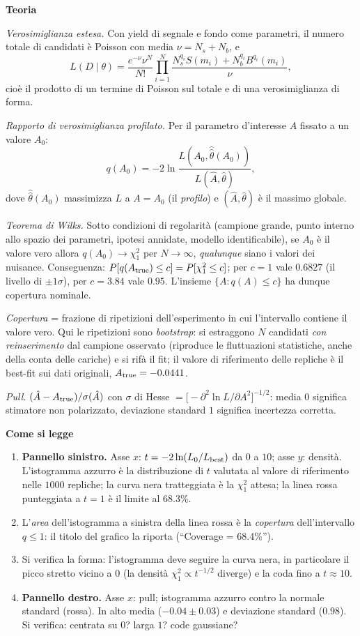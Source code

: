 \documentclass[10.5pt,a4paper]{article}
\newcommand{\sez}[1]{\par\Needspace{6\baselineskip}\medskip\noindent\textbf{\large #1}\par\nopagebreak\smallskip}
\begin{document}
\sez{Teoria}
\emph{Verosimiglianza estesa.} Con yield di segnale e fondo come parametri, il numero totale di candidati è Poisson con media $\nu=N_s+N_b$, e
\[
L(D\mid\theta)=\frac{e^{-\nu}\nu^N}{N!}\prod_{i=1}^N\frac{N_s^{q_i}S(m_i)+N_b^{q_i}B^{q_i}(m_i)}{\nu},
\]
cioè il prodotto di un termine di Poisson sul totale e di una verosimiglianza di forma.

\emph{Rapporto di verosimiglianza profilato.} Per il parametro d'interesse $A$ fissato a un valore $A_0$:
\[
q(A_0)=-2\ln\frac{L(A_0,\hat{\hat\theta}(A_0))}{L(\hat A,\hat\theta)},
\]
dove $\hat{\hat\theta}(A_0)$ massimizza $L$ a $A=A_0$ (il \emph{profilo}) e $(\hat A,\hat\theta)$ è il massimo globale.

\emph{Teorema di Wilks.} Sotto condizioni di regolarità (campione grande, punto interno allo spazio dei parametri, ipotesi annidate, modello identificabile), se $A_0$ è il valore vero allora $q(A_0)\to\chi^2_1$ per $N\to\infty$, \emph{qualunque} siano i valori dei nuisance. Conseguenza: $P[q(A_{\rm true})\le c]=P[\chi^2_1\le c]$; per $c=1$ vale $0.6827$ (il livello di $\pm1\sigma$), per $c=3.84$ vale $0.95$. L'insieme $\{A:q(A)\le c\}$ ha dunque copertura nominale.

\emph{Copertura} = frazione di ripetizioni dell'esperimento in cui l'intervallo contiene il valore vero. Qui le ripetizioni sono \emph{bootstrap}: si estraggono $N$ candidati \emph{con reinserimento} dal campione osservato (riproduce le fluttuazioni statistiche, anche della conta delle cariche) e si rifà il fit; il valore di riferimento delle repliche è il best-fit sui dati originali, $A_{\rm true}=-0.0441$.

\emph{Pull.} $(\hat A-A_{\rm true})/\sigma(\hat A)$ con $\sigma$ di Hesse $=\big[-\partial^2\ln L/\partial A^2\big]^{-1/2}$: media $0$ significa stimatore non polarizzato, deviazione standard $1$ significa incertezza corretta.

\sez{Come si legge}
\begin{enumerate}
\item \textbf{Pannello sinistro.} Asse $x$: $t=-2\ln(L_0/L_{\rm best})$ da $0$ a $10$; asse $y$: densità. L'istogramma azzurro è la distribuzione di $t$ valutata al valore di riferimento nelle $1000$ repliche; la curva nera tratteggiata è la $\chi^2_1$ attesa; la linea rossa punteggiata a $t=1$ è il limite al $68.3\%$.
\item L'\emph{area} dell'istogramma a sinistra della linea rossa è la \emph{copertura} dell'intervallo $q\le1$: il titolo del grafico la riporta (``Coverage = 68.4\%'').
\item Si verifica la forma: l'istogramma deve seguire la curva nera, in particolare il picco stretto vicino a $0$ (la densità $\chi^2_1\propto t^{-1/2}$ diverge) e la coda fino a $t\approx10$.
\item \textbf{Pannello destro.} Asse $x$: pull; istogramma azzurro contro la normale standard (rossa). In alto media ($-0.04\pm0.03$) e deviazione standard ($0.98$). Si verifica: centrata su $0$? larga $1$? code gaussiane?
\end{enumerate}
\end{document}
